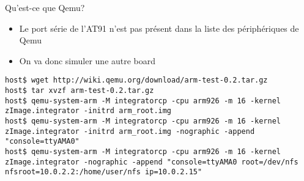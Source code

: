 \begin{frame}[fragile=singleslide]{Qu'est-ce que Qemu?}
  \begin{itemize}
  \item Le  port série de l'AT91  n'est pas présent dans  la liste des
    périphériques de Qemu
  \item On va donc simuler une autre board
  \end{itemize}
  \begin{lstlisting}[basicstyle=\ttfamily\scriptsize\color{colBasic}]
host$ wget http://wiki.qemu.org/download/arm-test-0.2.tar.gz
host$ tar xvzf arm-test-0.2.tar.gz
host$ qemu-system-arm -M integratorcp -cpu arm926 -m 16 -kernel zImage.integrator -initrd arm_root.img
host$ qemu-system-arm -M integratorcp -cpu arm926 -m 16 -kernel zImage.integrator -initrd arm_root.img -nographic -append "console=ttyAMA0"
host$ qemu-system-arm -M integratorcp -cpu arm926 -m 16 -kernel zImage.integrator -nographic -append "console=ttyAMA0 root=/dev/nfs nfsroot=10.0.2.2:/home/user/nfs ip=10.0.2.15"
  \end{lstlisting}
\end{frame}






